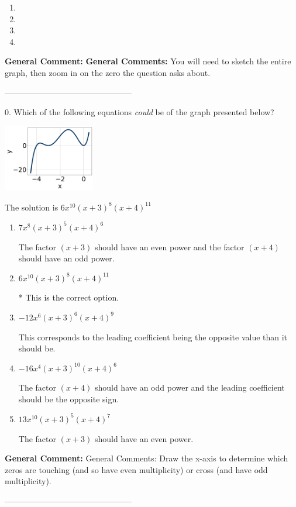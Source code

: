 \documentclass{extbook}[14pt]
\begin{document}
\begin{enumerate}[label=\Alph*.] 
\item   
\item   
\item   
\item   
\end{enumerate} 
 
\textbf{General Comment:} \textbf{General Comments:} You will need to sketch the entire graph, then zoom in on the zero the question asks about. 

-----------------------------------------------

0. Which of the following equations \textit{could} be of the graph presented below?
\begin{center} \includegraphics[width=0.3\textwidth]{../Figures/polyGraphToFunctionC.png} \end{center} 

The solution is $ 6x^{10} (x + 3)^{8} (x + 4)^{11} $ 

\begin{enumerate}[label=\Alph*.] 
\item $ 7x^{8} (x + 3)^{5} (x + 4)^{6} $ 

 The factor $(x + 3)$ should have an even power and the factor $(x + 4)$ should have an odd power. 
\item $ 6x^{10} (x + 3)^{8} (x + 4)^{11} $ 

 * This is the correct option. 
\item $ -12x^{6} (x + 3)^{6} (x + 4)^{9} $ 

 This corresponds to the leading coefficient being the opposite value than it should be. 
\item $ -16x^{4} (x + 3)^{10} (x + 4)^{6} $ 

 The factor $(x + 4)$ should have an odd power and the leading coefficient should be the opposite sign. 
\item $ 13x^{10} (x + 3)^{5} (x + 4)^{7} $ 

 The factor $(x + 3)$ should have an even power. 
\end{enumerate} 
 
\textbf{General Comment:} General Comments: Draw the x-axis to determine which zeros are touching (and so have even multiplicity) or cross (and have odd multiplicity). 

-----------------------------------------------
\end{document}
